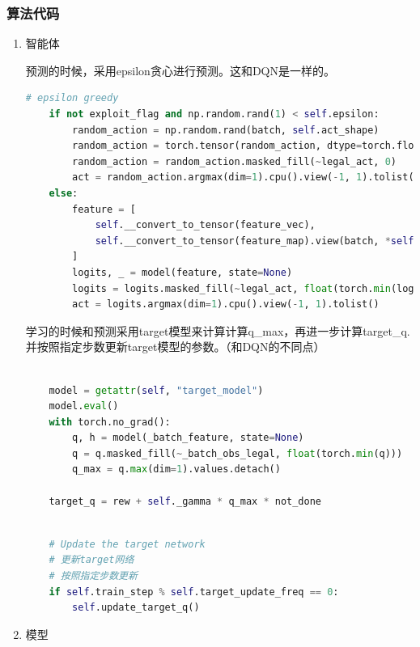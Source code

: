 \subsubsection{算法代码}

\begin{enumerate}
    
\item 智能体

预测的时候，采用epsilon贪心进行预测。这和DQN是一样的。

\begin{lstlisting}[language=Python]
    # epsilon greedy
    if not exploit_flag and np.random.rand(1) < self.epsilon:
        random_action = np.random.rand(batch, self.act_shape)
        random_action = torch.tensor(random_action, dtype=torch.float32).to(self.device)
        random_action = random_action.masked_fill(~legal_act, 0)
        act = random_action.argmax(dim=1).cpu().view(-1, 1).tolist()
    else:
        feature = [
            self.__convert_to_tensor(feature_vec),
            self.__convert_to_tensor(feature_map).view(batch, *self.obs_split[1]),
        ]
        logits, _ = model(feature, state=None)
        logits = logits.masked_fill(~legal_act, float(torch.min(logits)))
        act = logits.argmax(dim=1).cpu().view(-1, 1).tolist()
\end{lstlisting}

学习的时候和预测采用target模型来计算计算q\_max，再进一步计算target\_q.并按照指定步数更新target模型的参数。（和DQN的不同点）
\begin{lstlisting}[language=Python]

    model = getattr(self, "target_model")
    model.eval()
    with torch.no_grad():
        q, h = model(_batch_feature, state=None)
        q = q.masked_fill(~_batch_obs_legal, float(torch.min(q)))
        q_max = q.max(dim=1).values.detach()

    target_q = rew + self._gamma * q_max * not_done
\end{lstlisting}

\begin{lstlisting}[language=Python]

    # Update the target network
    # 更新target网络
    # 按照指定步数更新
    if self.train_step % self.target_update_freq == 0:
        self.update_target_q()
\end{lstlisting}

\item 模型



\end{enumerate}
